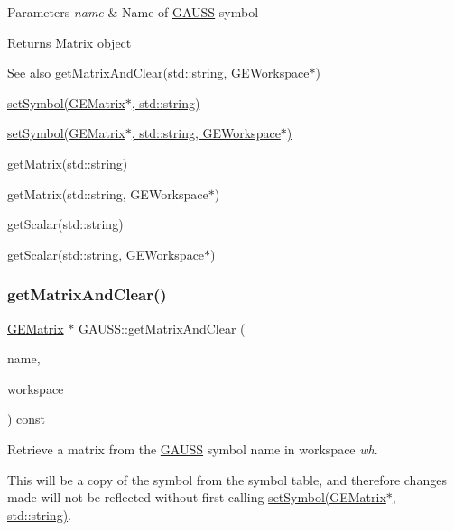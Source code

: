 \begin{DoxyParams}{Parameters}
{\em name} & Name of \hyperlink{class_g_a_u_s_s}{G\+A\+U\+SS} symbol \\
\hline
\end{DoxyParams}
\begin{DoxyReturn}{Returns}
Matrix object
\end{DoxyReturn}
\begin{DoxySeeAlso}{See also}
get\+Matrix\+And\+Clear(std\+::string, G\+E\+Workspace$\ast$) 

\hyperlink{class_g_a_u_s_s_ab51cbcd5a66ba3355f52bf10bf31f7e3}{set\+Symbol(\+G\+E\+Matrix$\ast$, std\+::string)} 

\hyperlink{class_g_a_u_s_s_a23181c31041882ce839f816ce56e1231}{set\+Symbol(\+G\+E\+Matrix$\ast$, std\+::string, G\+E\+Workspace$\ast$)} 

get\+Matrix(std\+::string) 

get\+Matrix(std\+::string, G\+E\+Workspace$\ast$) 

get\+Scalar(std\+::string) 

get\+Scalar(std\+::string, G\+E\+Workspace$\ast$) 
\end{DoxySeeAlso}
\mbox{\label{class_g_a_u_s_s_a0e770eaeebc8cd3c95ad52883b9f08df}} 
\subsubsection{\texorpdfstring{get\+Matrix\+And\+Clear()}{getMatrixAndClear()}\hspace{0.1cm}{\footnotesize\ttfamily [2/2]}}
{\footnotesize\ttfamily \hyperlink{class_g_e_matrix}{G\+E\+Matrix} $\ast$ G\+A\+U\+S\+S\+::get\+Matrix\+And\+Clear (\begin{DoxyParamCaption}\item[{std\+::string}]{name,  }\item[{\hyperlink{class_g_e_workspace}{G\+E\+Workspace} $\ast$}]{workspace }\end{DoxyParamCaption}) const}



Retrieve a matrix from the \hyperlink{class_g_a_u_s_s}{G\+A\+U\+SS} symbol name in workspace {\itshape wh}. 

This will be a copy of the symbol from the symbol table, and therefore changes made will not be reflected without first calling \hyperlink{class_g_a_u_s_s_ab51cbcd5a66ba3355f52bf10bf31f7e3}{set\+Symbol(\+G\+E\+Matrix$\ast$, std\+::string)}.

